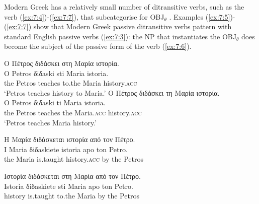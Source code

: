 \documentclass[output=paper]{langsci/langscibook}
\begin{document}
\begin{exe}
\end{exe}

Modern Greek has a relatively small number of ditransitive verbs, such as the verb  (\ref{ex:7:4})-(\ref{ex:7:7}), that subcategorise for OBJ$_\theta$  \citep{kordoni2004}. Examples (\ref{ex:7:5})-(\ref{ex:7:7}) show that  Modern Greek passive  ditransitive verbs pattern with standard English passive verbs (\ref{ex:7:3}):  the NP  that instantiates the OBJ$_\theta$ does become the subject of the passive form of the verb (\ref{ex:7:6}). 

\begin{exe}
\ex \label{ex:7:4}
\begin{xlist}
\ex
\glll Ο Πέτρος διδάσκει στη Μαρία  ιστορία.\\
O Petros δiδaski sti Maria  istoria. \\
          the Petros teaches to.the  Maria  history.\textsc{acc} \\
\glt     `Petros teaches  history to Maria.’
\ex
\glll  Ο Πέτρος διδάσκει τη Μαρία  ιστορία.\\
O Petros δiδaski ti Maria istoria.  \\
         the Petros teaches the  Maria.\textsc{acc}  history.\textsc{acc} \\
\glt    `Petros teaches Maria history.'
\end{xlist}
\end{exe}

\ea
\label{ex:7:5}
\glll Η Μαρία διδάσκεται ιστορία από τον Πέτρο.\\
I Maria δiδaskiete istoria  apo ton Petro.\\
the Maria is.taught  history.\textsc{acc}  by the Petros\\
\z

\z

\ea
\label{ex:7:7}
\glll Ιστορία διδάσκεται στη Μαρία από τον Πέτρο. \\
Istoria  δiδaskiete sti Maria apo ton Petro.\\
           history  is.taught to.the Maria by the Petros\\
\z
\end{document}
